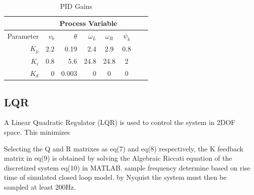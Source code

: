         \begin{table}[H]
            \centering
            \begin{tabular}{|r|r|r|r|c|c|c|c}
                \hline
                & \multicolumn{5}{c|}{Process Variable}  \\
                \hline
                Parameter & $v_b$ & $\theta$  & $\omega_L$ & $\omega_R$ & $\dot{\psi_b}$ \\
                \hline      
                $K_p$ & 2.2 & 0.19 & 2.4 & 2.9 & 0.8 \\
                $K_i$ & 0.8 & 5.6 & 24.8 & 24.8 & 2\\
                $K_d$ & 0 & 0.003 & 0 & 0  &  0\\
                \hline
            \end{tabular}
            \caption{PID Gains}
        \end{table}
        \pagebreak{}
        \subsection{LQR}
        A Linear Quadratic Regulator (LQR) is used to control the system in 2DOF space.
        This minimizes 
        
       
        Selecting the Q and R matrixes as eq(7) and eq(8) respectively, 
        the K feedback matrix in eq(9) is obtained by solving the Algebraic Riccati
        equation of the discretized system eq(10) in MATLAB.
        sample frequency determine based on rise time of simulated closed loop model. 
        by Nyquist the system must then be sampled at least 200Hz. 

        \pagebreak{}
